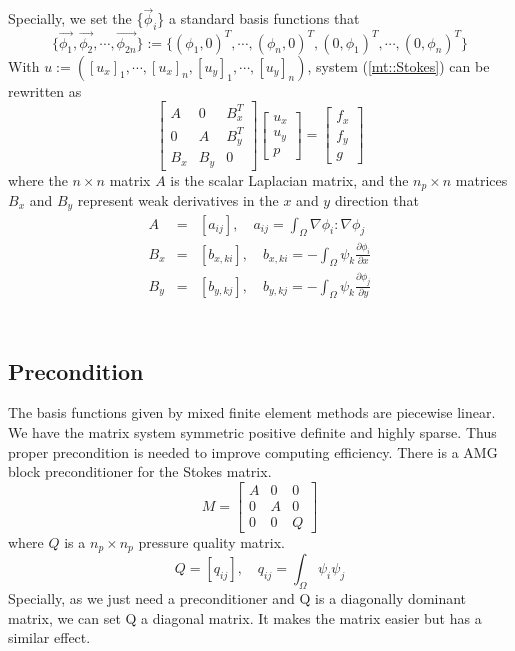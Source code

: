 \documentclass[a4paper]{article}
\begin{document}
Specially, we set the \{$\vec{\phi}_i$\} a standard basis functions that
\begin{equation}
\{\vec{\phi_1},\vec{\phi_2},\cdots,\vec{\phi_{2n}} \}:=\{(\phi_1,0)^T,\cdots,(\phi_n,0)^T,(0,\phi_1)^T,\cdots,(0,\phi_n)^T\}
\label{eq::basisfunction}
\end{equation}
With $u:=([u_x]_1,\cdots,[u_x]_n,[u_y]_1,\cdots,[u_y]_n)$, system (\ref{mt::Stokes}) can be rewritten as
\begin{equation}
\left[ \begin{array}{ccc}
A & 0 & B_x^T \\
0 & A & B_y^T \\
B_x & B_y & 0
\end{array}
\right]
\left[\begin{array}{ccc}
u_x\\
u_y\\
p
\end{array}
\right]=
\left[\begin{array}{ccc}
f_x\\
f_y\\
g
\end{array}
\right]
\label{Stokes}
\end{equation}
where the $n\times n$ matrix $A$ is the scalar Laplacian matrix, and the $n_p\times n$ matrices $B_x$ and $B_y$ represent weak derivatives in the $x$ and $y$ direction that 	
\begin{equation}
\begin{array}{rcl}
A &=& [a_{ij}], \quad a_{ij} = \int_{\Omega} \nabla \phi_i : \nabla \phi_j \\
B_x &=& [b_{x,ki}], \quad b_{x,ki} = -\int_{\Omega} \psi_k \frac{\partial \phi_i}{\partial x} \\
B_y &=& [b_{y,kj}], \quad b_{y,kj} = -\int_{\Omega} \psi_k \frac{\partial \phi_j}{\partial y} \\
\end{array}
\label{Stokes-mtvalue}
\end{equation}
 \\
\subsection{Precondition}
The basis functions given by mixed finite element methods are piecewise linear. We have the matrix system symmetric positive definite and highly sparse. Thus proper precondition is needed to improve computing efficiency. There is a AMG block preconditioner for the Stokes matrix.
\begin{equation}
M = \left[ \begin{array}{ccc}
A & 0 & 0 \\
0 & A & 0 \\
0 & 0 & Q
\end{array}
\right]
\end{equation}
where $Q$ is a $n_p\times n_p$ pressure quality matrix.
\begin{equation}
Q = [q_{ij}], \quad q_{ij} = \int_{\Omega} \psi_i\psi_j
\label{pr::Q}
\end{equation}
Specially, as we just need a preconditioner and Q is a diagonally dominant matrix, we can set Q a diagonal matrix. It makes the matrix easier but has a similar effect.
\end{document}
